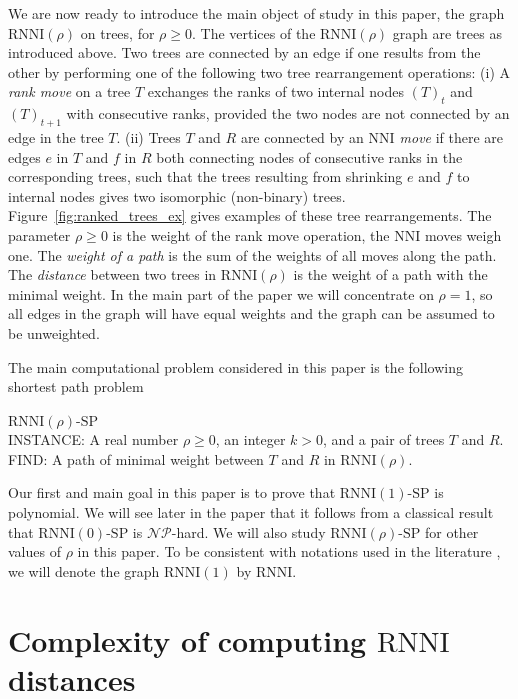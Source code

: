 \documentclass[11pt]{amsart}
\newcommand{\rnni}{\mathrm{RNNI}}
\newcommand{\nni}{\mathrm{NNI}}
\newcommand{\np}{\mathcal{NP}}
\newcommand{\decprob}[1]{\rnni(#1)\text{-}\mathrm{SP}}
\newcommand{\summary}[1]{} %
\begin{document}
\summary{Defining graph $\rnni(\rho)$.}
We are now ready to introduce the main object of study in this paper, the graph $\rnni(\rho)$ on trees, for $\rho \geq 0$.
The vertices of the $\rnni(\rho)$ graph are trees as introduced above.
Two trees are connected by an edge if one results from the other by performing one of the following two tree rearrangement operations:
(i) A \emph{rank move} on a tree $T$ exchanges the ranks of two internal nodes $(T)_t$ and $(T)_{t+1}$ with consecutive ranks, provided the two nodes are not connected by an edge in the tree $T$.
(ii) Trees $T$ and $R$ are connected by an \emph{$\nni$ move} if there are edges $e$ in $T$ and $f$ in $R$ both connecting nodes of consecutive ranks in the corresponding trees, such that the trees resulting from shrinking $e$ and $f$ to internal nodes gives two isomorphic (non-binary) trees.
Figure~\ref{fig:ranked_trees_ex} gives examples of these tree rearrangements.
The parameter $\rho \geq 0$ is the weight of the rank move operation, the $\nni$ moves weigh one.
The \emph{weight of a path} is the sum of the weights of all moves along the path.
The \emph{distance} between two trees in $\rnni(\rho)$ is the weight of a path with the minimal weight.
In the main part of the paper we will concentrate on $\rho = 1$, so all edges in the graph will have equal weights and the graph can be assumed to be unweighted.

The main computational problem considered in this paper is the following shortest path problem

\medskip

\noindent $\decprob{\rho}$
\medskip\\
INSTANCE: A real number $\rho \geq 0$, an integer $k > 0$, and a pair of trees $T$ and $R$.\\
FIND: A path of minimal weight between $T$ and $R$ in $\rnni(\rho)$.

\medskip

Our first and main goal in this paper is to prove that $\decprob{1}$ is polynomial.
We will see later in the paper that it follows from a classical result \autocite{Dasgupta2000-xa} that $\decprob{0}$ is $\np$-hard.
We will also study $\decprob{\rho}$ for other values of $\rho$ in this paper.
To be consistent with notations used in the literature \autocite{Gavryushkin2018-ol, Collienne2019-ca}, we will denote the graph $\rnni(1)$ by $\rnni$.


\section{Complexity of computing $\rnni$ distances}
\label{sec:rnni_complexity}
\end{document}
